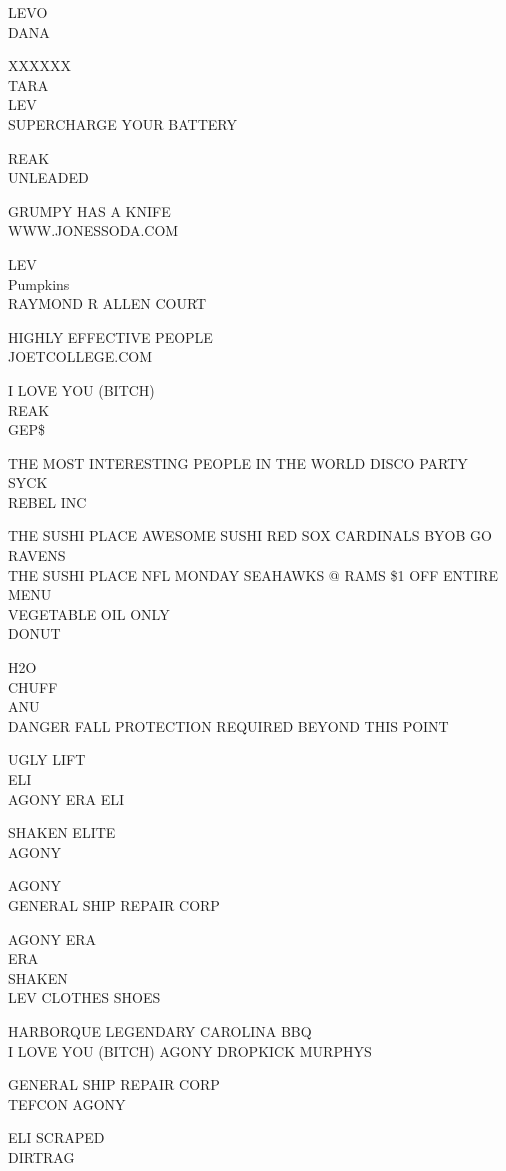 \documentclass[10pt,letterpaper]{article}
\begin{document}
LEVO\\
DANA

XXXXXX\\
TARA\\
LEV\\
SUPERCHARGE YOUR BATTERY

REAK\\
UNLEADED

GRUMPY HAS A KNIFE\\
WWW.JONESSODA.COM

LEV\\
Pumpkins\\
RAYMOND R ALLEN COURT

HIGHLY EFFECTIVE PEOPLE\\
JOETCOLLEGE.COM

I LOVE YOU (BITCH)\\
REAK\\
GEP\$

THE MOST INTERESTING PEOPLE IN THE WORLD DISCO PARTY\\
SYCK\\
REBEL INC

THE SUSHI PLACE AWESOME SUSHI RED SOX CARDINALS BYOB GO RAVENS\\
THE SUSHI PLACE NFL MONDAY SEAHAWKS @ RAMS \$1 OFF ENTIRE MENU\\
VEGETABLE OIL ONLY\\
DONUT

H2O\\
CHUFF\\
ANU\\
DANGER FALL PROTECTION REQUIRED BEYOND THIS POINT

UGLY LIFT\\
ELI\\
AGONY ERA ELI

SHAKEN ELITE\\
AGONY

AGONY\\
GENERAL SHIP REPAIR CORP

AGONY ERA\\
ERA\\
SHAKEN\\
LEV CLOTHES SHOES

HARBORQUE LEGENDARY CAROLINA BBQ\\
I LOVE YOU (BITCH) AGONY DROPKICK MURPHYS

GENERAL SHIP REPAIR CORP\\
TEFCON AGONY

ELI SCRAPED\\
DIRTRAG
\end{document}
